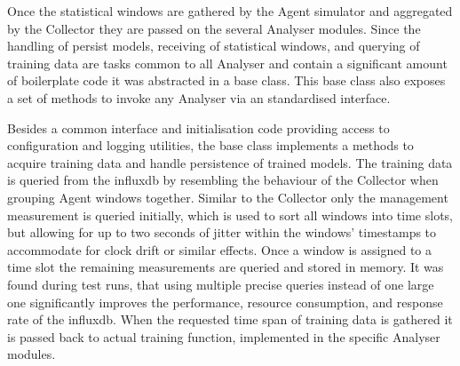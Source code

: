 \begin{comment}
\begin{itemize}
	\item non functional base class, unifying commonly used functions for analyser modules, including
		\subitem logging and config setup
		\subitem model persistence (loading and saving)
		\subitem acquiring training data from \gls{influxdb}
		\subitem common entrypoint functions for training and analyse modes
	\item training data is generated by first querying the \code{agent\_status} metric for the requested training period
	\item this metric is used to group the different agents by time slots, similar to what the collector (cf. Section~\ref{sec:impl:collector}) is doing
		\subitem fuzzy, allowing for up to 2 seconds between the capture timestamps of the different windows
		\subitem accommodate for clock drift of the agents and delays, jitter, etc of the transport
	\item once the grouping is finished the remaining metrics are queried for all windows in a time slots
	\item reduced RAM overhead during the querying and enables better (fuzzy) grouping, mitigating shortcoming in the \gls{influxdb} query language
\end{itemize}
\end{comment}

Once the statistical windows are gathered by the Agent simulator and aggregated by the Collector they are passed on the several Analyser modules.
Since the handling of persist models, receiving of statistical windows, and querying of training data are tasks common to all Analyser and contain a significant amount of boilerplate code it was abstracted in a base class.
This base class also exposes a set of methods to invoke any Analyser via an standardised interface.

Besides a common interface and initialisation code providing access to configuration and logging utilities, the base class implements a methods to acquire training data and handle persistence of trained models.
The training data is queried from the \gls{influxdb} by resembling the behaviour of the Collector when grouping Agent windows together.
Similar to the Collector only the management measurement is queried initially, which is used to sort all windows into time slots, but allowing for up to two seconds of jitter within the windows' timestamps to accommodate for clock drift or similar effects.
Once a window is assigned to a time slot the remaining measurements are queried and stored in memory. It was found during test runs, that using multiple precise queries instead of one large one significantly improves the performance, resource consumption, and response rate of the \gls{influxdb}.
When the requested time span of training data is gathered it is passed back to actual training function, implemented in the specific Analyser modules.

